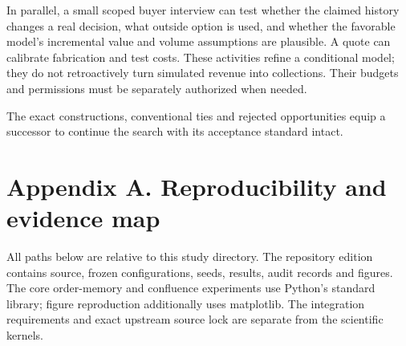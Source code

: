 \documentclass[
  11pt,
]{article}
\begin{document}
In parallel, a small scoped buyer interview can test whether the claimed
history changes a real decision, what outside option is used, and
whether the favorable model's incremental value and volume assumptions
are plausible. A quote can calibrate fabrication and test costs. These
activities refine a conditional model; they do not retroactively turn
simulated revenue into collections. Their budgets and permissions must
be separately authorized when needed.

The exact constructions, conventional ties and rejected opportunities
equip a successor to continue the search with its acceptance standard
intact.

\hypertarget{appendix-a.-reproducibility-and-evidence-map}{%
\section{Appendix A. Reproducibility and evidence
map}\label{appendix-a.-reproducibility-and-evidence-map}}

All paths below are relative to this study directory. The repository
edition contains source, frozen configurations, seeds, results, audit
records and figures. The core order-memory and confluence experiments
use Python's standard library; figure reproduction additionally uses
matplotlib. The integration requirements and exact upstream source lock
are separate from the scientific kernels.
\end{document}
